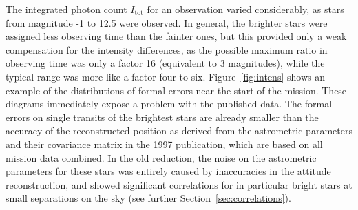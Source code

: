 \documentclass{aa}
\begin{document}
The integrated photon count $I_\mathrm{tot}$ for an observation varied 
considerably, as stars from magnitude -1 to 12.5 were observed. In 
general, the brighter stars were assigned less observing time than the fainter 
ones, but this provided only a weak compensation for the intensity 
differences, as the possible maximum ratio in observing time was only a 
factor 16 (equivalent to 3 magnitudes), while the typical range was more 
like a factor four to six. Figure~\ref{fig:intens} shows an example of the 
distributions of formal errors near the start of the mission. These diagrams 
immediately expose a problem with the published data. The formal errors on 
single transits of the brightest stars are already smaller than the accuracy
of the reconstructed position as derived from the astrometric parameters and 
their covariance matrix in the 1997 publication, which are based on all 
mission data combined. In the old reduction, the noise on the astrometric 
parameters for these stars was entirely caused by inaccuracies in the attitude 
reconstruction, and showed significant correlations for in particular bright 
stars at small separations on the sky (see further 
Section~\ref{sec:correlations}).
\end{document}
